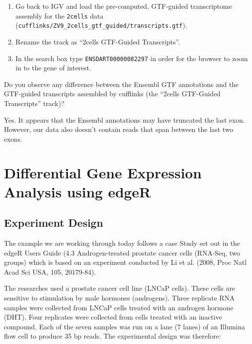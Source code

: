 \begin{steps}
\begin{enumerate}
  \item Go back to IGV and load the pre-computed, GTF-guided transcriptome
  assembly for the \texttt{2cells} data
  (\texttt{cufflinks/ZV9\_2cells\_gtf\_guided/transcripts.gtf}).
  \item Rename the track as ``2cells GTF-Guided Transcripts''.
  \item In the search box type \texttt{ENSDART00000082297} in order for the
  browser to zoom in to the gene of interest.
\end{enumerate}
\end{steps}

\begin{questions}
Do you observe any difference between the Ensembl GTF annotations and the
GTF-guided transcripts assembled by cufflinks (the ``2cells GTF-Guided Transcripts'' track)?
\begin{answer}
Yes. It appears that the Ensembl annotations may have truncated the last exon.
However, our data also doesn't contain reads that span between the last two
exons.
\end{answer}
\end{questions}

\newpage

\section{Differential Gene Expression Analysis using edgeR}

\subsection{Experiment Design}

The example we are working through today follows a case Study set out in the edgeR Users
Guide (4.3 Androgen-treated prostate cancer cells (RNA-Seq, two groups) which is based on
an experiment conducted by Li et al. (2008, Proc Natl Acad Sci USA, 105, 20179-84).

The researches used a prostate cancer cell line (LNCaP cells). These cells are sensitive
to stimulation by male hormones (androgens). Three replicate RNA samples were collected
from LNCaP cells treated with an androgen hormone (DHT). Four replicates were collected
from cells treated with an inactive compound. Each of the seven samples was run on a
lane (7 lanes) of an Illumina flow cell to produce 35 bp reads. The experimental design
was therefore:

